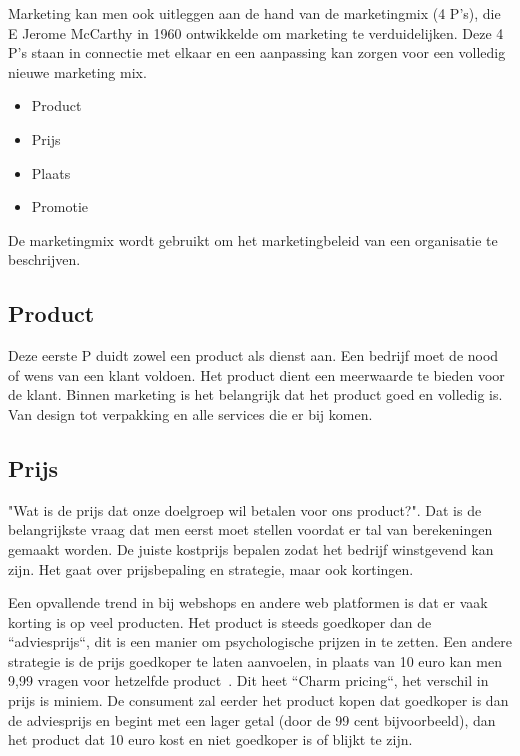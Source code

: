 Marketing kan men ook uitleggen aan de hand van de marketingmix (4 P's), die E Jerome McCarthy in 1960 ontwikkelde om marketing te verduidelijken. Deze 4 P's staan in connectie met elkaar en een aanpassing kan zorgen voor een volledig nieuwe marketing mix.~\autocite{Forsey2019}

\begin{itemize}
	\item Product
	\item Prijs
	\item Plaats
	\item Promotie
\end{itemize}

De marketingmix wordt gebruikt om het marketingbeleid van een organisatie te beschrijven. 

\subsection{Product} \label{sec:marketing-product}
Deze eerste P duidt zowel een product als dienst aan. Een bedrijf moet de nood of wens van een klant voldoen. Het product dient een meerwaarde te bieden voor de klant. Binnen marketing is het belangrijk dat het product goed en volledig is. Van design tot verpakking en alle services die er bij komen.
 
\subsection{Prijs} \label{sec:marketing-prijs}
"Wat is de prijs dat onze doelgroep wil betalen voor ons product?". Dat is de belangrijkste vraag dat men eerst moet stellen voordat er tal van berekeningen gemaakt worden. De juiste kostprijs bepalen zodat het bedrijf winstgevend kan zijn. Het gaat over prijsbepaling en strategie, maar ook kortingen.

Een opvallende trend in bij webshops en andere web platformen is dat er vaak korting is op veel producten. Het product is steeds goedkoper dan de ``adviesprijs``, dit is een manier om psychologische prijzen in te zetten. Een andere strategie is de prijs goedkoper te laten aanvoelen, in plaats van 10 euro kan men 9,99 vragen voor hetzelfde product~\autocite{InternetMarketingUniversiteit2016}. Dit heet ``Charm pricing``, het verschil in prijs is miniem. De consument zal eerder het product kopen dat goedkoper is dan de adviesprijs en begint met een lager getal (door de 99 cent bijvoorbeeld), dan het product dat 10 euro kost en niet goedkoper is of blijkt te zijn.


